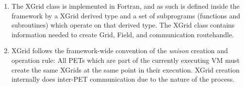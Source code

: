 

\begin{enumerate}

\item The XGrid class is implemented in Fortran, and as such is
defined inside the framework by a XGrid derived type and a set of 
subprograms (functions and subroutines) which operate on that derived type.  
The XGrid class contains information needed to create Grid, Field, and
communication routehandle.

\item XGrid follows the framework-wide convention of the
{\it unison} creation and operation rule: All PETs which are
part of the currently executing VM must create the
same XGrids at the same point in their execution. 
XGrid creation internally does inter-PET
communication due to the nature of the process.  
\end{enumerate}
